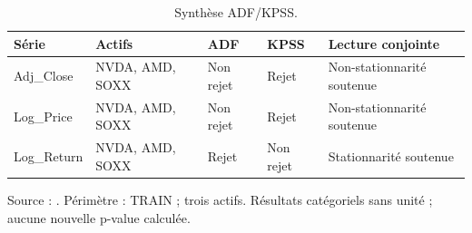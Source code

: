 \begin{table}[!htbp]
\centering
\caption{Synthèse ADF/KPSS.}
\label{tab:stationarity}
\small
\setlength{\tabcolsep}{4pt}
\renewcommand{\arraystretch}{1.16}
\begin{tabularx}{\linewidth}{XXXXX}
\toprule
\textbf{Série} & \textbf{Actifs} & \textbf{ADF} & \textbf{KPSS} & \textbf{Lecture conjointe} \\
\midrule
Adj\_Close & NVDA, AMD, SOXX & Non rejet & Rejet & Non-stationnarité soutenue \\
Log\_Price & NVDA, AMD, SOXX & Non rejet & Rejet & Non-stationnarité soutenue \\
Log\_Return & NVDA, AMD, SOXX & Rejet & Non rejet & Stationnarité soutenue \\
\bottomrule
\end{tabularx}
\par\smallskip
\begin{minipage}{\linewidth}\footnotesize Source : . Périmètre : TRAIN ; trois actifs. Résultats catégoriels sans unité ; aucune nouvelle p-value calculée.
\end{minipage}
\end{table}
